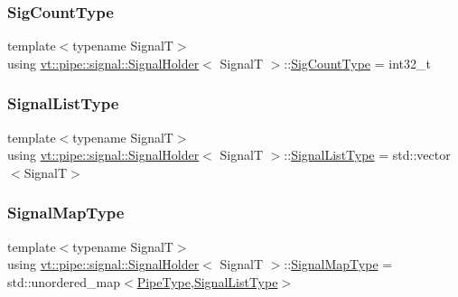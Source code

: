 \subsubsection{\texorpdfstring{Sig\+Count\+Type}{SigCountType}}
{\footnotesize\ttfamily template$<$typename SignalT$>$ \\
using \hyperlink{structvt_1_1pipe_1_1signal_1_1_signal_holder}{vt\+::pipe\+::signal\+::\+Signal\+Holder}$<$ SignalT $>$\+::\hyperlink{structvt_1_1pipe_1_1signal_1_1_signal_holder_aced54515f402b63f6dea174e5b027c81}{Sig\+Count\+Type} =  int32\+\_\+t}

\mbox{\label{structvt_1_1pipe_1_1signal_1_1_signal_holder_ab04d27c1c48b28813fdd8af29a4cda92}} 
\subsubsection{\texorpdfstring{Signal\+List\+Type}{SignalListType}}
{\footnotesize\ttfamily template$<$typename SignalT$>$ \\
using \hyperlink{structvt_1_1pipe_1_1signal_1_1_signal_holder}{vt\+::pipe\+::signal\+::\+Signal\+Holder}$<$ SignalT $>$\+::\hyperlink{structvt_1_1pipe_1_1signal_1_1_signal_holder_ab04d27c1c48b28813fdd8af29a4cda92}{Signal\+List\+Type} =  std\+::vector$<$SignalT$>$}

\mbox{\label{structvt_1_1pipe_1_1signal_1_1_signal_holder_a064e16bdc96f93675bc7fb967121a527}} 
\subsubsection{\texorpdfstring{Signal\+Map\+Type}{SignalMapType}}
{\footnotesize\ttfamily template$<$typename SignalT$>$ \\
using \hyperlink{structvt_1_1pipe_1_1signal_1_1_signal_holder}{vt\+::pipe\+::signal\+::\+Signal\+Holder}$<$ SignalT $>$\+::\hyperlink{structvt_1_1pipe_1_1signal_1_1_signal_holder_a064e16bdc96f93675bc7fb967121a527}{Signal\+Map\+Type} =  std\+::unordered\+\_\+map$<$\hyperlink{namespacevt_ac9852acda74d1896f48f406cd72c7bd3}{Pipe\+Type},\hyperlink{structvt_1_1pipe_1_1signal_1_1_signal_holder_ab04d27c1c48b28813fdd8af29a4cda92}{Signal\+List\+Type}$>$}



